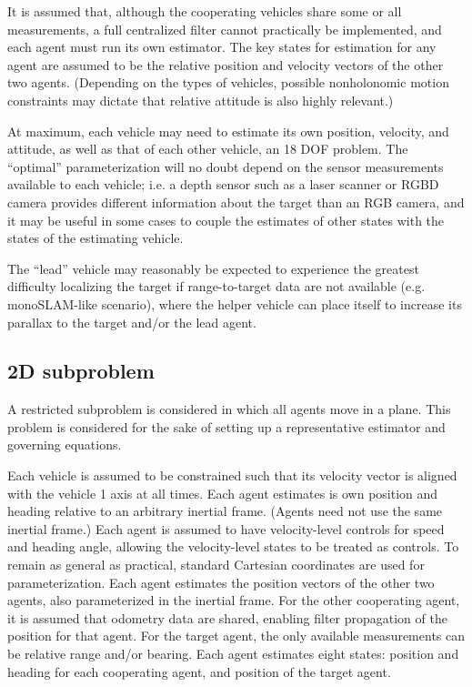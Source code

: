 \documentclass{aiaa-tc}
\begin{document}
It is assumed that, although the cooperating vehicles share some or all measurements, a full centralized filter cannot practically be implemented, and each agent must run its own estimator. The key states for estimation for any agent are assumed to be the relative position and velocity vectors of the other two agents. (Depending on the types of vehicles, possible nonholonomic motion constraints may dictate that relative attitude is also highly relevant.) 

At maximum, each vehicle may need to estimate its own position, velocity, and attitude, as well as that of each other vehicle, an 18 DOF problem. The ``optimal'' parameterization will no doubt depend on the sensor measurements available to each vehicle; i.e. a depth sensor such as a laser scanner or RGBD camera provides different information about the target than an RGB camera, and it may be useful in some cases to couple the estimates of other states with the states of the estimating vehicle.

The ``lead'' vehicle may reasonably be expected to experience the greatest difficulty localizing the target if range-to-target data are not available (e.g. monoSLAM-like scenario), where the helper vehicle can place itself to increase its parallax to the target and/or the lead agent.

\subsection{2D subproblem}

A restricted subproblem is considered in which all agents move in a plane. This problem is considered for the sake of setting up a representative estimator and governing equations.

Each vehicle is assumed to be constrained such that its velocity vector is aligned with the vehicle 1 axis at all times. Each agent estimates is own position and heading relative to an arbitrary inertial frame. (Agents need not use the same inertial frame.) Each agent is assumed to have velocity-level controls for speed and heading angle, allowing the velocity-level states to be treated as controls. To remain as general as practical, standard Cartesian coordinates are used for parameterization. Each agent estimates the position vectors of the other two agents, also parameterized in the inertial frame. For the other cooperating agent, it is assumed that odometry data are shared, enabling filter propagation of the position for that agent. For the target agent, the only available measurements can be relative range and/or bearing. Each agent estimates eight states: position and heading for each cooperating agent, and position of the target agent.
\end{document}
